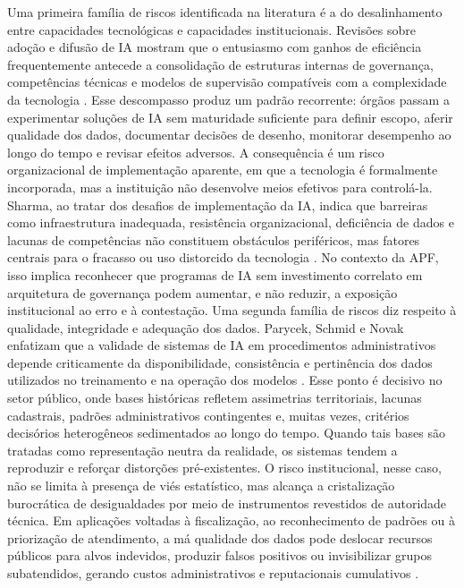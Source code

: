 \documentclass[12pt,a4paper]{article}
\begin{document}
Uma primeira família de riscos identificada na literatura é a do desalinhamento entre capacidades tecnológicas e capacidades institucionais. Revisões sobre adoção e difusão de IA mostram que o entusiasmo com ganhos de eficiência frequentemente antecede a consolidação de estruturas internas de governança, competências técnicas e modelos de supervisão compatíveis com a complexidade da tecnologia \autocite{madan2022ai} \autocite{alhosani2024opportunities}. Esse descompasso produz um padrão recorrente: órgãos passam a experimentar soluções de IA sem maturidade suficiente para definir escopo, aferir qualidade dos dados, documentar decisões de desenho, monitorar desempenho ao longo do tempo e revisar efeitos adversos. A consequência é um risco organizacional de implementação aparente, em que a tecnologia é formalmente incorporada, mas a instituição não desenvolve meios efetivos para controlá-la. Sharma, ao tratar dos desafios de implementação da IA, indica que barreiras como infraestrutura inadequada, resistência organizacional, deficiência de dados e lacunas de competências não constituem obstáculos periféricos, mas fatores centrais para o fracasso ou uso distorcido da tecnologia \autocite{sharma2021implementing}. No contexto da APF, isso implica reconhecer que programas de IA sem investimento correlato em arquitetura de governança podem aumentar, e não reduzir, a exposição institucional ao erro e à contestação.
Uma segunda família de riscos diz respeito à qualidade, integridade e adequação dos dados. Parycek, Schmid e Novak enfatizam que a validade de sistemas de IA em procedimentos administrativos depende criticamente da disponibilidade, consistência e pertinência dos dados utilizados no treinamento e na operação dos modelos \autocite{parycek2023artificial}. Esse ponto é decisivo no setor público, onde bases históricas refletem assimetrias territoriais, lacunas cadastrais, padrões administrativos contingentes e, muitas vezes, critérios decisórios heterogêneos sedimentados ao longo do tempo. Quando tais bases são tratadas como representação neutra da realidade, os sistemas tendem a reproduzir e reforçar distorções pré-existentes. O risco institucional, nesse caso, não se limita à presença de viés estatístico, mas alcança a cristalização burocrática de desigualdades por meio de instrumentos revestidos de autoridade técnica. Em aplicações voltadas à fiscalização, ao reconhecimento de padrões ou à priorização de atendimento, a má qualidade dos dados pode deslocar recursos públicos para alvos indevidos, produzir falsos positivos ou invisibilizar grupos subatendidos, gerando custos administrativos e reputacionais cumulativos \autocite{pi2021machine} \autocite{serra2024a}.
\end{document}
